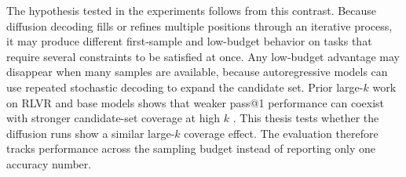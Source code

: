 The hypothesis tested in the experiments follows from this contrast. Because
diffusion decoding fills or refines multiple positions through an iterative
process, it may produce different first-sample and low-budget behavior on tasks
that require several constraints to be satisfied at once. Any low-budget
advantage may disappear when many samples are available, because autoregressive
models can use repeated stochastic decoding to expand the candidate set. Prior
large-$k$ work on RLVR and base models shows that weaker pass@1 performance can
coexist with stronger candidate-set coverage at high $k$ \cite{yue2025rlvr}.
This thesis tests whether the diffusion runs show a similar large-$k$ coverage
effect. The evaluation therefore tracks performance across
the sampling budget instead of reporting only one accuracy number.

